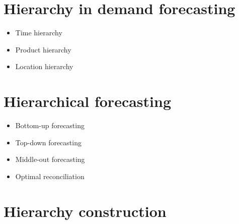 \section{Hierarchy in demand forecasting}
\label{sec:hierarchy_in_demand_forecasting}


\begin{itemize}
    \item Time hierarchy
    \item Product hierarchy
    \item Location hierarchy
\end{itemize}


\section{Hierarchical forecasting}
\label{sec:hierarchical_forecasting}

\begin{itemize}
    \item Bottom-up forecasting
    \item Top-down forecasting
    \item Middle-out forecasting
    \item Optimal reconciliation
\end{itemize}


\section{Hierarchy construction}
\label{sec:hierarchy-creation}




